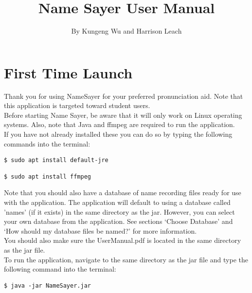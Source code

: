 \documentclass[a4paper,12pt]{article}
\title{Name Sayer User Manual}
\author{By Kungeng Wu and Harrison Leach}
\begin{document}
	
\maketitle
\newpage

\tableofcontents
\cleardoublepage

\listoffigures
\newpage

\section{First Time Launch}
Thank you for using NameSayer for your preferred pronunciation aid. Note that this application is targeted toward student users. 
\\

Before starting Name Sayer, be aware that it will only work on Linux operating systems. Also, note that Java and ffmpeg are required to run the application. 
\\

If you have not already installed these you can do so by typing the following commands into the terminal:
\begin{verbatim}
$ sudo apt install default-jre
\end{verbatim}
\begin{verbatim}
$ sudo apt install ffmpeg
\end{verbatim}

Note that you should also have a database of name recording files ready for use with the application. The application will default to using a database called 'names' (if it exists) in the same directory as the jar. However, you can select your own database from the application. See sections ‘Choose Database’ and ‘How should my database files be named?’ for more information. 
\\

You should also make sure the UserManual.pdf is located in the same directory as the jar file.
\\

To run the application, navigate to the same directory as the jar file and type the following command into the terminal:
\begin{verbatim}
$ java -jar NameSayer.jar
\end{verbatim}
\newpage
\end{document}
